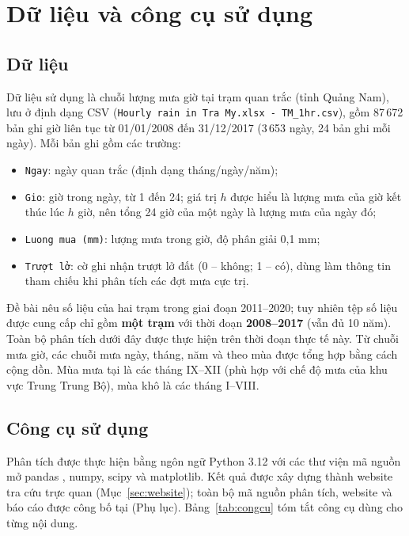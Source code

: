 \section{Dữ liệu và công cụ sử dụng}

\subsection{Dữ liệu}

Dữ liệu sử dụng là chuỗi lượng mưa giờ tại trạm quan trắc \TenTram{} (tỉnh Quảng Nam), lưu ở định dạng CSV (\texttt{Hourly rain in Tra My.xlsx - TM\_1hr.csv}), gồm 87\,672 bản ghi giờ liên tục từ 01/01/2008 đến 31/12/2017 (3\,653 ngày, 24 bản ghi mỗi ngày). Mỗi bản ghi gồm các trường:

\begin{itemize}[leftmargin=1.5cm]
  \item \texttt{Ngay}: ngày quan trắc (định dạng tháng/ngày/năm);
  \item \texttt{Gio}: giờ trong ngày, từ 1 đến 24; giá trị $h$ được hiểu là lượng mưa của giờ kết thúc lúc $h$ giờ, nên tổng 24 giờ của một ngày là lượng mưa của ngày đó;
  \item \texttt{Luong mua (mm)}: lượng mưa trong giờ, độ phân giải 0,1 mm;
  \item \texttt{Trượt lở}: cờ ghi nhận trượt lở đất (0 -- không; 1 -- có), dùng làm thông tin tham chiếu khi phân tích các đợt mưa cực trị.
\end{itemize}

Đề bài nêu số liệu của hai trạm trong giai đoạn 2011--2020; tuy nhiên tệp số liệu được cung cấp chỉ gồm \textbf{một trạm \TenTram} với thời đoạn \textbf{2008--2017} (vẫn đủ 10 năm). Toàn bộ phân tích dưới đây được thực hiện trên thời đoạn thực tế này. Từ chuỗi mưa giờ, các chuỗi mưa ngày, tháng, năm và theo mùa được tổng hợp bằng cách cộng dồn. Mùa mưa tại \TenTram{} là các tháng IX--XII (phù hợp với chế độ mưa của khu vực Trung Trung Bộ), mùa khô là các tháng I--VIII.

\subsection{Công cụ sử dụng}

Phân tích được thực hiện bằng ngôn ngữ Python 3.12 với các thư viện mã nguồn mở pandas \cite{pandas}, numpy, scipy \cite{scipy} và matplotlib. Kết quả được xây dựng thành website tra cứu trực quan \WebURL{} (Mục~\ref{sec:website}); toàn bộ mã nguồn phân tích, website và báo cáo được công bố tại \GitHubURL{} (Phụ lục). Bảng~\ref{tab:congcu} tóm tắt công cụ dùng cho từng nội dung.

